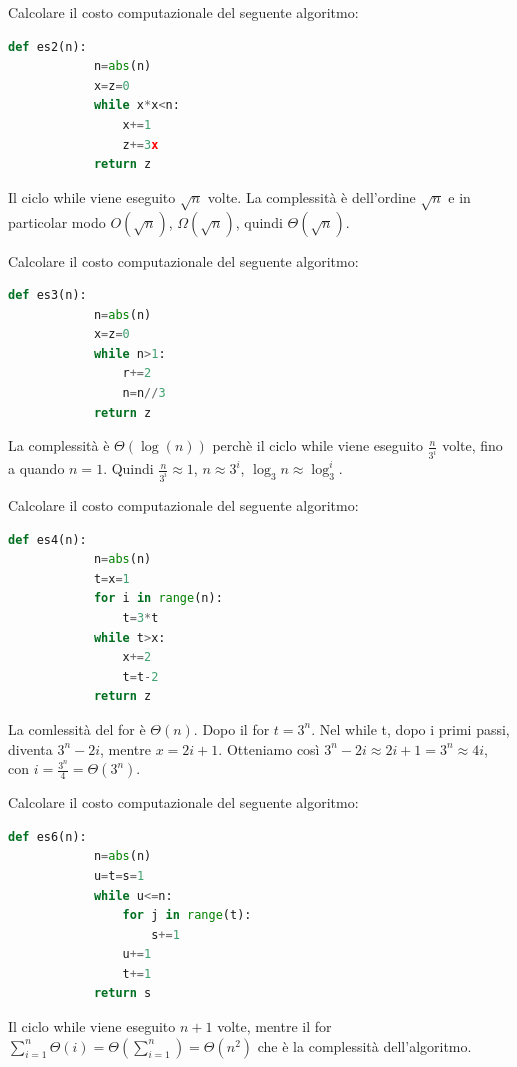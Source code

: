 \begin{exercise}
    Calcolare il costo computazionale del seguente algoritmo:
    \begin{lstlisting}[language=Python]
        def es2(n):
            n=abs(n)
            x=z=0
            while x*x<n:
                x+=1
                z+=3x
            return z
    \end{lstlisting}
    
    Il ciclo while viene eseguito $\sqrt{n}$ volte. La complessità è dell'ordine $\sqrt{n}$ e in particolar modo $O(\sqrt{n})$, $\Omega(\sqrt{n})$, quindi $\Theta(\sqrt{n})$.
    
\end{exercise}

\begin{exercise}
    Calcolare il costo computazionale del seguente algoritmo:
    \begin{lstlisting}[language=Python]
        def es3(n):
            n=abs(n)
            x=z=0
            while n>1:
                r+=2
                n=n//3
            return z
    \end{lstlisting}
    
    La complessità è $\Theta(\log(n))$ perchè il ciclo while viene eseguito $\frac{n}{3^i}$ volte, fino a quando $n=1$. Quindi $\frac{n}{3^i}\approx1$, $n\approx3^i$, $\log_3n\approx\log_3^i$.
    
\end{exercise}

\begin{exercise}
    Calcolare il costo computazionale del seguente algoritmo:
    \begin{lstlisting}[language=Python]
        def es4(n):
            n=abs(n)
            t=x=1
            for i in range(n):
                t=3*t
            while t>x:
                x+=2
                t=t-2
            return z
    \end{lstlisting}
    
    La comlessità del for è $\Theta(n)$. Dopo il for $t=3^n$. Nel while t, dopo i primi passi, diventa $3^n-2i$, mentre $x=2i+1$. Otteniamo così $3^n-2i\approx2i+1=3^n\approx4i$, con $i=\frac{3^n}{4}=\Theta(3^n)$.
\end{exercise}

\begin{exercise}
    Calcolare il costo computazionale del seguente algoritmo:
    \begin{lstlisting}[language=Python]
        def es6(n):
            n=abs(n)
            u=t=s=1
            while u<=n:
                for j in range(t):
                    s+=1 
                u+=1
                t+=1
            return s
    \end{lstlisting}
    
    Il ciclo while viene eseguito $n+1$ volte, mentre il for $\sum^n_{i=1}\Theta(i)=\Theta(\sum^n_{i=1})=\Theta(n^2)$ che è la complessità dell'algoritmo.
\end{exercise}

